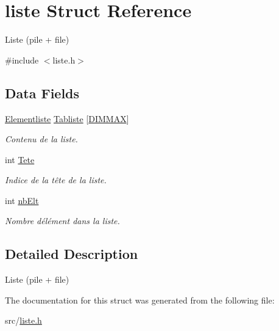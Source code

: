 \hypertarget{structliste}{}\section{liste Struct Reference}
\label{structliste}


Liste (pile + file)  




{\ttfamily \#include $<$liste.\+h$>$}

\subsection*{Data Fields}
\begin{DoxyCompactItemize}
\item 
\mbox{\label{structliste_a5306c3d8ec2ffff7bc66e76132cc395e}} 
\mbox{\hyperlink{elementliste_8h_ad1cbc6cf883405e3e7ab3cd6e1451dbb}{Elementliste}} \mbox{\hyperlink{structliste_a5306c3d8ec2ffff7bc66e76132cc395e}{Tabliste}} \mbox{[}\mbox{\hyperlink{liste_8h_a5a724e718ea66e676efba2647aa56414}{D\+I\+M\+M\+AX}}\mbox{]}
\begin{DoxyCompactList}\small\item\em Contenu de la liste. \end{DoxyCompactList}\item 
\mbox{\label{structliste_ac27f6a14865441ed2e343acc6738aad2}} 
int \mbox{\hyperlink{structliste_ac27f6a14865441ed2e343acc6738aad2}{Tete}}
\begin{DoxyCompactList}\small\item\em Indice de la tête de la liste. \end{DoxyCompactList}\item 
\mbox{\label{structliste_ac6a9b89b3dd1181842948cdc6a1ee389}} 
int \mbox{\hyperlink{structliste_ac6a9b89b3dd1181842948cdc6a1ee389}{nb\+Elt}}
\begin{DoxyCompactList}\small\item\em Nombre d\textquotesingle{}élément dans la liste. \end{DoxyCompactList}\end{DoxyCompactItemize}


\subsection{Detailed Description}
Liste (pile + file) 

The documentation for this struct was generated from the following file\+:\begin{DoxyCompactItemize}
\item 
src/\mbox{\hyperlink{liste_8h}{liste.\+h}}\end{DoxyCompactItemize}
